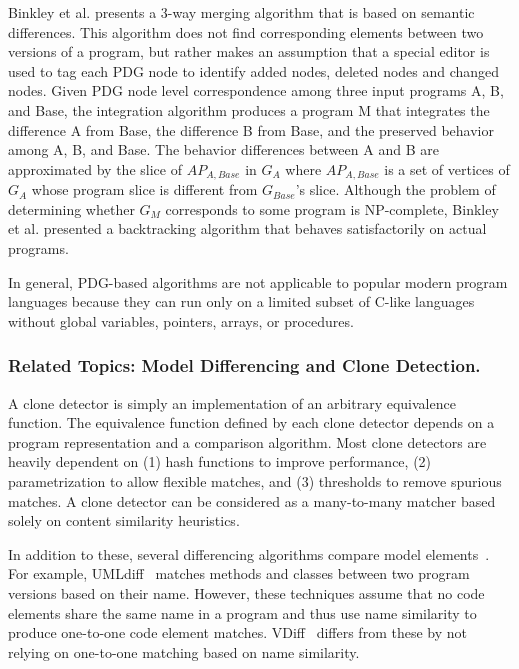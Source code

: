 \documentclass[runningheads,a4paper]{llncs}
\begin{document}
Binkley et al. \cite{Binkley1995} presents a 3-way merging algorithm that is based on semantic differences. This algorithm does not find corresponding elements between two versions of a program, but rather makes an assumption that a special editor is used to tag each PDG node to identify added nodes, deleted nodes and changed nodes. Given PDG node level correspondence among three input programs A, B, and Base, the integration algorithm produces a program M that integrates the difference A from Base, the difference B from Base, and the preserved behavior among A, B, and Base. The behavior differences between A and B are approximated by the slice of $AP_{A,Base}$ in $G_A$ where $AP_{A,Base}$ is a set of vertices of $G_A$ whose program slice is different from $G_{Base}$'s slice. Although the problem of determining  whether $G_M$ corresponds to some program is NP-complete, Binkley et al. presented a backtracking algorithm that behaves satisfactorily on actual programs. 

In general, PDG-based algorithms are not applicable to popular modern program languages because they can run only on a limited subset of C-like languages without global variables, pointers, arrays, or procedures. 


\subsubsection{Related Topics: Model Differencing and Clone Detection.} 

A clone detector is simply an implementation of an arbitrary equivalence function. The equivalence function defined by each clone detector depends on a program representation and a comparison algorithm. Most clone detectors are heavily dependent on (1) hash functions to improve performance, (2) parametrization to allow flexible matches, and (3) thresholds to remove spurious matches. A clone detector can be considered as a many-to-many matcher based solely on content similarity heuristics. 

In addition to these, several differencing algorithms compare model elements~\cite{UMLDiff2005, Ohst2003:umldiff, Soto2006:deltaprocess}. For example, UMLdiff~\cite{UMLDiff2005} matches methods and classes between two program versions based on their name. However, these techniques assume that no code elements share the same name in a program and thus use name similarity to produce one-to-one code element matches.  VDiff~\cite{Duley2012:vdiff,Duley2010:vdiff} differs from these by not relying on one-to-one matching based on name similarity. 
\end{document}
